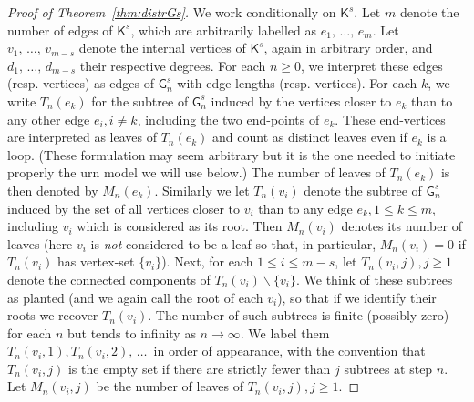 \documentclass[AHL,Unicode,longabstracts,published]{cedram}
\newcommand{\sG}{\mathsf{G}}
\newcommand{\sK}{\mathsf{K}}
\begin{document}
\begin{proof}[Proof of Theorem~\ref{thm:distrGs}]
We work conditionally on $\sK^s$. Let $m$ denote the number of edges of $\sK^s$, which are arbitrarily labelled as $e_1,\,\ldots,\,e_m$. Let $v_1,\,\ldots,\,v_{m-s}$ denote the internal vertices of $\sK^s$, again in arbitrary order, and $d_1,\,\ldots,\,d_{m-s}$ their respective degrees. For each $n \geq 0$, we interpret these edges (resp. vertices) as edges of $\sG^s_n$ with edge-lengths (resp. vertices). For each $k$, we write $T_n(e_k)$ for the subtree of $\sG^s_n$ induced by the vertices closer to $e_k$ than to any other edge $e_i,i\neq k$, including the two end-points of $e_k$. These end-vertices are interpreted as leaves of $T_n(e_k)$ and count as distinct leaves even if $e_k$ is a loop. (These formulation may seem arbitrary but it is the one needed to initiate properly the urn model we will use below.) The number of leaves of $T_n(e_k)$ is then denoted by $M_n(e_k)$. Similarly we let $T_n(v_{i})$ denote the subtree of $\sG^s_n$ induced by the set of all vertices closer to $v_i$ than to any edge $e_k, 1 \leq k \leq m$, including $v_i$ which is considered as its root. Then $M_n(v_i)$ denotes its number of leaves (here $v_i$ is \emph{not} considered to be a leaf so that, in particular, $M_n(v_i)=0$ if $T_n(v_{i})$ has vertex-set $\{v_i\}$). Next, for each $1 \leq i \leq m-s$, let $T_{n}(v_{i},j),j \geq 1$ denote the connected components of $T_n(v_{i})\backslash \{v_i\}$. We think of these subtrees as planted (and we again call the root of each $v_i$), so that if we identify their roots we recover $T_n(v_i)$. The number of such subtrees is finite (possibly zero) for each $n$ but tends to infinity as $n\rightarrow \infty$. We label them $T_{n}(v_{i},1), T_{n}(v_{i},2),\,\ldots\,$ in order of appearance, with the convention that $T_{n}(v_i,j)$ is the empty set if there are strictly fewer than $j$ subtrees at step $n$. Let $M_{n}(v_i,j)$ be the number of leaves of $T_{n}(v_{i},j), j \geq 1$.

\vspace{4pt}


\end{proof}
\end{document}

